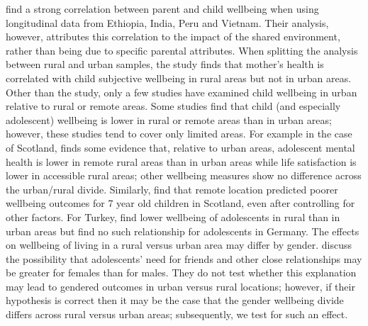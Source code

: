 \documentclass[10pt, letterpaper]{article}
\begin{document}
\begin{spacing}{1.4}
\citet{borga2022} find a strong correlation
between parent and child wellbeing when using longitudinal data from Ethiopia,
India, Peru and Vietnam. Their analysis, however,  attributes this correlation to the impact of the shared environment, rather than being due to specific parental attributes. When splitting the analysis between rural and urban samples, the study finds that mother's health is correlated with child subjective wellbeing in rural areas but not in urban areas.
Other than the \citet{borga2022} study, only a few studies have examined child
wellbeing in urban relative to rural or remote areas. Some studies find that
child (and especially adolescent) wellbeing is lower in rural or remote areas
than in urban areas; however, these studies tend to cover only limited areas. For example in the case of Scotland, \citet{levin2014} finds some evidence that, relative to urban areas, adolescent mental health is lower in remote rural areas than in urban areas while life satisfaction is lower in accessible rural areas; other wellbeing measures show no difference across the urban/rural divide. Similarly, \citet{parkes2016} find that remote location predicted poorer wellbeing outcomes for 7 year old children in Scotland, even after controlling for other factors. For Turkey, \citet{yeresyan2014} find lower wellbeing of adolescents in rural than in urban areas but find no such relationship for adolescents in Germany. 
The effects on wellbeing of living in a rural versus urban area may differ by
gender. \citet{powdthavee2008} discuss the possibility that adolescents' need
for friends and other close relationships may be greater for females than for
males. They do not test whether this explanation may lead to gendered outcomes
in urban versus rural locations; however, if their hypothesis is correct then it
may be the case that the gender wellbeing divide differs across rural versus
urban areas; subsequently, we test for such an effect.


\end{spacing}
\end{document}
